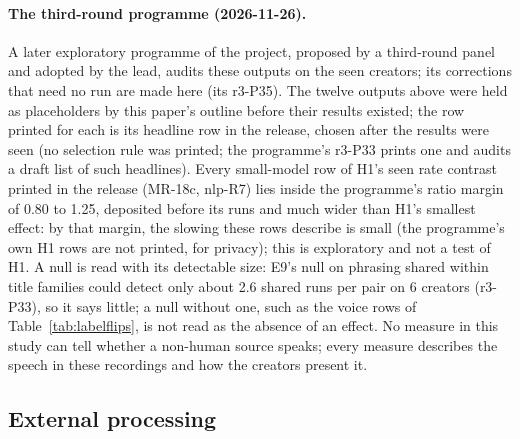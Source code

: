 \paragraph{The third-round programme (2026-11-26).} A later exploratory programme of the project, proposed by a
third-round panel and adopted by the lead, audits these outputs on the seen creators; its corrections that need no run are made
here (its r3-P35). The twelve outputs above were held as placeholders by this paper's outline before their results
existed; the row printed for each is its headline row in the release, chosen after the results were seen (no
selection rule was printed; the programme's r3-P33 prints one and audits a draft list of such headlines). Every
small-model row of H1's seen rate contrast printed in the release (MR-18c, nlp-R7) lies inside the programme's
ratio margin of 0.80 to 1.25, deposited before its runs and much wider than H1's smallest effect: by that margin,
the slowing these rows describe is small (the programme's own H1 rows are not printed, for privacy); this is
exploratory and not a test of H1. A null is read with its detectable size: E9's null on phrasing shared within
title families could detect only about 2.6 shared runs per pair on 6 creators (r3-P33), so it says little; a null
without one, such as the voice rows of Table~\ref{tab:labelflips}, is not read as the absence of an effect. No
measure in this study can tell whether a non-human source speaks; every measure describes the speech in these
recordings and how the creators present it.

\begin{table}[t]
\centering
\small

\caption{Exploratory outputs of the reporting plan (SHA-256 prefix \PlanShaPrefix) and its addendum 1, counted by
status (built and reported in full; waiting for first-round labels; waiting for freeze 2; will not run, with its
reason; runs without labels; waiting for a decision or data; other) and by place (main text; appendix or supplement),
and by status at report time in the status table of the exploratory release (\ExpRelease), which also lists the items
built before the round, the paper review's later list and the outputs that waited for freeze 2, one row per output with
its time of run and code hash.}
\label{tab:outputs}
\end{table}

\subsection{External processing}
\label{app:external}

